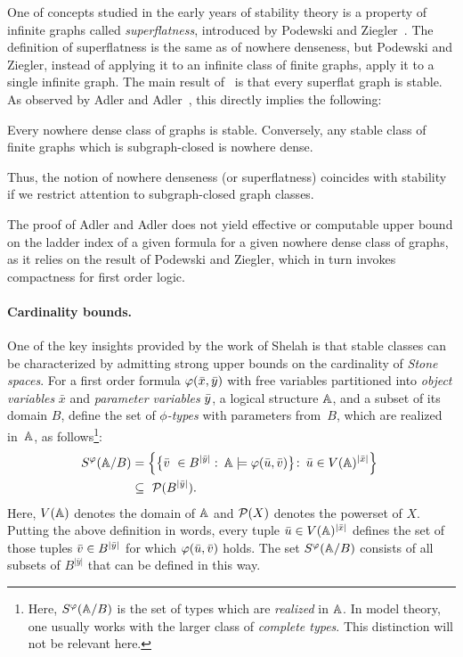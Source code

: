   One of concepts studied in the early 
  years of stability theory is 
  a property of infinite graphs  called \emph{superflatness}, introduced by Podewski and Ziegler~\cite{podewski1978stable}.
  The definition of superflatness is the same as   of nowhere denseness, but 
   Podewski and Ziegler,
  instead of applying it to an infinite class of finite graphs, apply it to a single infinite graph.
  The main result of~\cite{podewski1978stable} is that every superflat graph is stable.   
As observed by Adler and Adler~\cite{adler2014interpreting}, 
this directly implies  the following:
 \begin{theorem}\label{thm:adleradler}
 	Every nowhere dense class of graphs is stable. Conversely, any stable class of finite graphs which is subgraph-closed  is nowhere dense.
 \end{theorem}
 Thus, the notion of nowhere denseness (or superflatness) coincides with stability if we restrict attention to subgraph-closed graph classes.
 
The proof of Adler and Adler does not yield effective or computable upper bound on the 
ladder index of a given formula for a given nowhere dense class of graphs, as it relies on the result of Podewski and Ziegler, which in turn invokes compactness for first order logic.

\paragraph{Cardinality bounds.}
One of the key insights provided by the work of Shelah is that stable classes can be characterized by admitting strong upper bounds on the cardinality of \emph{Stone spaces}.
For a first order formula $\varphi(\bar{x},\bar{y})$ 
with free variables partitioned into \emph{object variables} $\bar x$ and \emph{parameter variables} $\bar{y}$, a logical structure $\mathbb A$,
and a subset of its domain $B$, define
the set of \emph{$\phi$-types} with parameters from~$B$, which are realized in~$\mathbb{A}$, as follows\footnote{Here, $S^\varphi(\mathbb A/B)$ is the set  of types which are \emph{realized} in $\mathbb A$. In model theory,
one usually works with the larger class of \emph{complete types}. This distinction will not be relevant here.}:
\begin{equation}\label{eq:stone-def}
\begin{split}
S^\varphi (\mathbb{A}/B) & = 
  \left\{\big\{\bar{v}\ \in B^{|\bar y|}\, \colon\, \mathbb{A}\models\varphi(\bar{u},\bar{v})\big\} \colon\, \bar{u}\in V(\mathbb{A})^{|\bar x|}\right\}\ \\ & \subseteq\  \mathcal{P}(B^{|\bar y|}).
 \end{split}
\end{equation}
Here, $V(\mathbb{A})$ denotes the domain of $\mathbb{A}$ and $\mathcal{P}(X)$ denotes the powerset of $X$.
Putting the above definition in words, every tuple $\bar{u}\in V(\mathbb{A})^{|\bar x|}$ defines the set of those tuples $\bar{v}\in B^{|\bar y|}$ for which $\varphi(\bar{u},\bar{v})$ holds.
The set $S^\varphi(\mathbb{A}/B)$ consists of all subsets of $B^{|\bar y|}$ that can be defined in this way.

